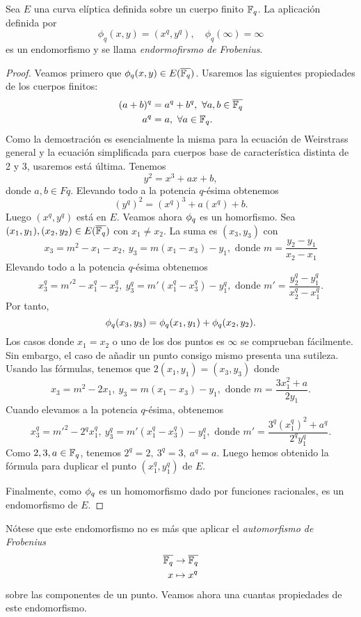 \begin{proposicion}
	Sea $E$ una curva elíptica definida sobre un cuerpo finito $\mathbb{F}_q$. La aplicación definida por
	$$
		\phi_q(x, y) = (x^q, y^q), \quad \phi_q(\infty) = \infty
	$$
	es un endomorfismo y se llama \emph{endormofirsmo de Frobenius}.
\end{proposicion}
\begin{proof}
Veamos primero que $\phi_q(x, y) \in E(\overline{\mathbb{F}_q})$. Usaremos las siguientes propiedades de los cuerpos finitos:
\begin{align*}
	(a + b)^q &= a^q + b^q, \ \forall a, b \in \overline{\mathbb{F}_q} \\
	a^q &= a, \ \forall a \in \mathbb{F}_q.
\end{align*}
Como la demostración es esencialmente la misma para la ecuación de Weirstrass general y la ecuación simplificada para cuerpos base de característica distinta de 2 y 3, usaremos está última. Tenemos
$$
	y^2 = x^3 + a x + b,
$$
donde $a, b \in Fq$. Elevando todo a la potencia $q$-ésima obtenemos
$$
	(y^q)^2 = (x^q)^3 + a (x^q) + b.
$$
Luego $(x^q, y^q)$ está en $E$. Veamos ahora $\phi_q$ es un homorfismo. Sea $(x_1, y_1), (x_2, y_2) \in E(\overline{\mathbb{F}_q})$ con $x_1 \neq x_2$. La suma es $(x_3, y_3)$ con
$$
	x_3 = m^2 - x_1 - x_2, \ y_3 = m (x_1 - x_3) - y_1, \textrm{ donde } m = \frac{y_2 - y_1}{x_2 - x_1}
$$
Elevando todo a la potencia $q$-ésima obtenemos
$$
	x_3^q = m'^2 - x_1^q - x_2^q, \ y_3^q = m' (x_1^q - x_3^q) - y_1^q, \textrm{ donde } m' = \frac{y_2^q - y_1^q}{x_2^q - x_1^q}.
$$
Por tanto,
$$
	\phi_q(x_3, y_3) = \phi_q(x_1, y_1) + \phi_q(x_2, y_2).
$$
Los casos donde $x_1 = x_2$ o uno de los dos puntos es $\infty$ se comprueban fácilmente. Sin embargo, el caso de añadir un punto consigo mismo presenta una sutileza. Usando las fórmulas, tenemos que $2 (x_1, y_1) = (x_3, y_3)$ donde
$$
	x_3 = m^2 - 2 x_1, \ y_3 = m (x_1 - x_3) - y_1, \textrm{ donde } m = \frac{3 x_1^2 + a}{2 y_1}.
$$
Cuando elevamos a la potencia $q$-ésima, obtenemos
$$
	x_3^q = m'^2 - 2^q x_1^q, \ y_3^q = m' (x_1^q - x_3^q) - y_1^q, \textrm{ donde } m' = \frac{3^q (x_1^q)^2 + a^q}{2^q y_1^q}.
$$
Como $2, 3, a \in \mathbb{F}_q$, tenemos $2^q = 2,\ 3^q = 3,\ a^q = a$. Luego hemos obtenido la fórmula para duplicar el punto $(x_1^q, y_1^q)$ de $E$.

Finalmente, como $\phi_q$ es un homomorfismo dado por funciones racionales, es un endomorfismo de $E$.
\end{proof}

Nótese que este endomorfismo no es más que aplicar el \emph{automorfismo de Frobenius}
\begin{align*}
	\overline{\mathbb{F}_q} &\to \overline{\mathbb{F}_q} \\
	x &\mapsto x^q
\end{align*}
sobre las componentes de un punto. Veamos ahora una cuantas propiedades de este endomorfismo.

